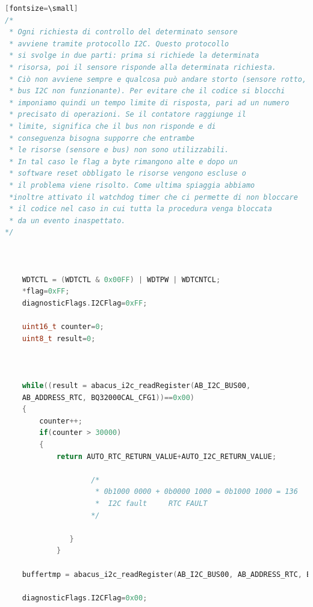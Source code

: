 \documentclass[LaM,binding=0.6cm]{../sapthesis}
\begin{document}
\begin{lstlisting}[language=c][fontsize=\small]
/*
 * Ogni richiesta di controllo del determinato sensore 
 * avviene tramite protocollo I2C. Questo protocollo 
 * si svolge in due parti: prima si richiede la determinata
 * risorsa, poi il sensore risponde alla determinata richiesta.
 * Ciò non avviene sempre e qualcosa può andare storto (sensore rotto, 
 * bus I2C non funzionante). Per evitare che il codice si blocchi 
 * imponiamo quindi un tempo limite di risposta, pari ad un numero 
 * precisato di operazioni. Se il contatore raggiunge il 
 * limite, significa che il bus non risponde e di 
 * conseguenza bisogna supporre che entrambe
 * le risorse (sensore e bus) non sono utilizzabili. 
 * In tal caso le flag a byte rimangono alte e dopo un 
 * software reset obbligato le risorse vengono escluse o 
 * il problema viene risolto. Come ultima spiaggia abbiamo 
 *inoltre attivato il watchdog timer che ci permette di non bloccare 
 * il codice nel caso in cui tutta la procedura venga bloccata 
 * da un evento inaspettato.
*/



    WDTCTL = (WDTCTL & 0x00FF) | WDTPW | WDTCNTCL;
    *flag=0xFF;
    diagnosticFlags.I2CFlag=0xFF;

    uint16_t counter=0;
    uint8_t result=0;



    while((result = abacus_i2c_readRegister(AB_I2C_BUS00, 
    AB_ADDRESS_RTC, BQ32000CAL_CFG1))==0x00)
    {
        counter++;
        if(counter > 30000)             
        {
            return AUTO_RTC_RETURN_VALUE+AUTO_I2C_RETURN_VALUE;

                    /*
                     * 0b1000 0000 + 0b0000 1000 = 0b1000 1000 = 136
                     *  I2C fault     RTC FAULT
                    */

               }
            }

    buffertmp = abacus_i2c_readRegister(AB_I2C_BUS00, AB_ADDRESS_RTC, BQ32000CAL_CFG1);

    diagnosticFlags.I2CFlag=0x00; 
    

\end{lstlisting}
\end{document}
